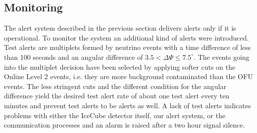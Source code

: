 \subsection{Monitoring}
The alert system described in the previous section delivers alerts only if it 
is operational. To monitor the system an additional kind of alerts were 
introduced.
Test 
alerts are multiplets formed by neutrino events with a time 
difference of less than 100 seconds and an angular difference of $3.5 < \Delta 
\Psi \leq 7.5^\circ$. The events going into the multiplet decision have been 
selected by applying softer cuts on the Online Level 2 events, i.e. they are 
more background contaminated than the OFU events. The less stringent cuts and 
the different condition for the angular difference yield the desired test alert 
rate of about one test alert every ten minutes and prevent test alerts to be 
alerts as well. A lack of test alerts indicates problems with either the 
IceCube detector itself, our alert system, or the communication processes and 
an 
alarm is raised after a two hour signal silence.